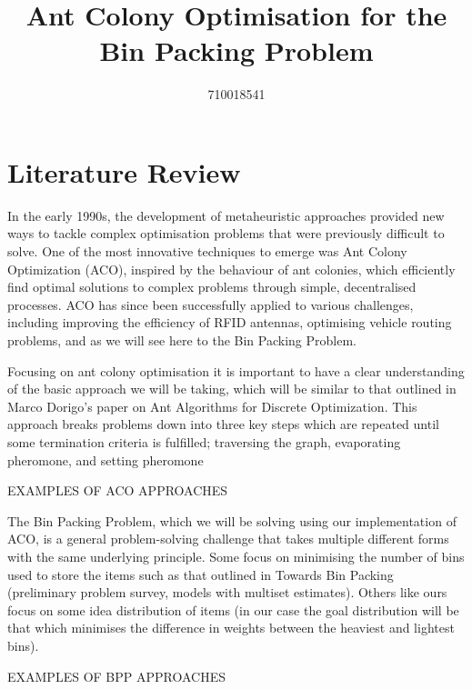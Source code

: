 \documentclass[sigconf]{acmart}
\begin{document}
    \title{Ant Colony Optimisation for the Bin Packing Problem}
    \author{710018541}
    \maketitle
    
    \section{Literature Review}
        In the early 1990s, the development of metaheuristic approaches provided new ways to tackle complex optimisation problems that were previously difficult to solve. One of the most innovative techniques to emerge was Ant Colony Optimization (ACO), inspired by the behaviour of ant colonies, which efficiently find optimal solutions to complex problems through simple, decentralised processes. ACO has since been successfully applied to various challenges, including improving the efficiency of RFID antennas\cite{4426906}, optimising vehicle routing problems\cite{Emilio2004AntCO}, and as we will see here to the Bin Packing Problem.\newline
        
        Focusing on ant colony optimisation it is important to have a clear understanding of the basic approach we will be taking, which will be similar to that outlined in Marco Dorigo's paper on Ant Algorithms for Discrete Optimization\cite{10.1162/106454699568728}. This approach breaks problems down into three key steps which are repeated until some termination criteria is fulfilled; traversing the graph, evaporating pheromone, and setting pheromone\newline

        EXAMPLES OF ACO APPROACHES\newline

        The Bin Packing Problem, which we will be solving using our implementation of ACO, is a general problem-solving challenge that takes multiple different forms with the same underlying principle. Some focus on minimising the number of bins used to store the items such as that outlined in Towards Bin Packing (preliminary problem survey, models with multiset estimates)\cite{Levin2016TowardsBP}. Others like ours focus on some idea distribution of items (in our case the goal distribution will be that which minimises the difference in weights between the heaviest and lightest bins).\newline

        EXAMPLES OF BPP APPROACHES
\end{document}
